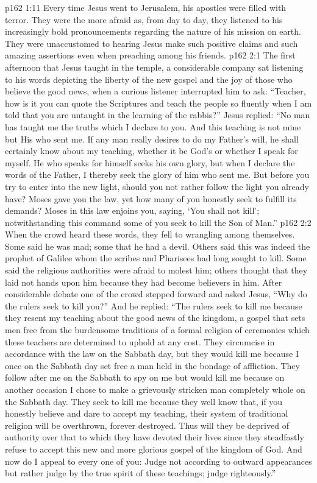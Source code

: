 \vs p162 1:11 Every time Jesus went to Jerusalem, his apostles were filled with terror. They were the more afraid as, from day to day, they listened to his increasingly bold pronouncements regarding the nature of his mission on earth. They were unaccustomed to hearing Jesus make such positive claims and such amazing assertions even when preaching among his friends.
\vs p162 2:1 The first afternoon that Jesus taught in the temple, a considerable company sat listening to his words depicting the liberty of the new gospel and the joy of those who believe the good news, when a curious listener interrupted him to ask: “Teacher, how is it you can quote the Scriptures and teach the people so fluently when I am told that you are untaught in the learning of the rabbis?” Jesus replied: \textcolor{ubdarkred}{“No man has taught me the truths which I declare to you. And this teaching is not mine but His who sent me. If any man really desires to do my Father’s will, he shall certainly know about my teaching, whether it be God’s or whether I speak for myself. He who speaks for himself seeks his own glory, but when I declare the words of the Father, I thereby seek the glory of him who sent me. But before you try to enter into the new light, should you not rather follow the light you already have? Moses gave you the law, yet how many of you honestly seek to fulfill its demands? Moses in this law enjoins you, saying, ‘You shall not kill’; notwithstanding this command some of you seek to kill the Son of Man.”}
\pc \vs p162 2:2 When the crowd heard these words, they fell to wrangling among themselves. Some said he was mad; some that he had a devil. Others said this was indeed the prophet of Galilee whom the scribes and Pharisees had long sought to kill. Some said the religious authorities were afraid to molest him; others thought that they laid not hands upon him because they had become believers in him. After considerable debate one of the crowd stepped forward and asked Jesus, “Why do the rulers seek to kill you?” And he replied: \textcolor{ubdarkred}{“The rulers seek to kill me because they resent my teaching about the good news of the kingdom, a gospel that sets men free from the burdensome traditions of a formal religion of ceremonies which these teachers are determined to uphold at any cost. They circumcise in accordance with the law on the Sabbath day, but they would kill me because I once on the Sabbath day set free a man held in the bondage of affliction. They follow after me on the Sabbath to spy on me but would kill me because on another occasion I chose to make a grievously stricken man completely whole on the Sabbath day. They seek to kill me because they well know that, if you honestly believe and dare to accept my teaching, their system of traditional religion will be overthrown, forever destroyed. Thus will they be deprived of authority over that to which they have devoted their lives since they steadfastly refuse to accept this new and more glorious gospel of the kingdom of God. And now do I appeal to every one of you: Judge not according to outward appearances but rather judge by the true spirit of these teachings; judge righteously.”}
